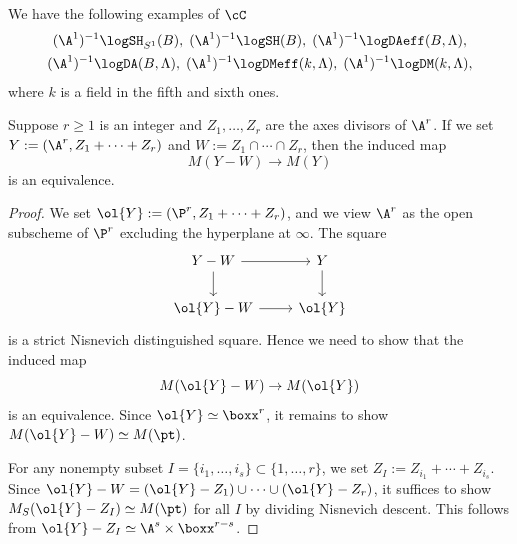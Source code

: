 \documentclass[10pt]{amsart}
\begin{document}
\begin{exm}
\label{2.4}
We have the following examples of $\cC$
\begin{gather*}
(\A^1)^{-1}\logSH_{S^1}(B),
\;
(\A^1)^{-1}\logSH(B),
\;
(\A^1)^{-1}\logDAeff(B,\Lambda),
\\
(\A^1)^{-1}\logDA(B,\Lambda),
\;
(\A^1)^{-1}\logDMeff(k,\Lambda),
\;
(\A^1)^{-1}\logDM(k,\Lambda),
\end{gather*}
where $k$ is a field in the fifth and sixth ones.
\end{exm}






\begin{lem}
\label{2.2}
Suppose $r\geq 1$ is an integer and $Z_1,\ldots,Z_r$ are the axes divisors of $\A^r$.
If we set $Y:=(\A^r,Z_1+\cdots+Z_r)$ and $W:=Z_1\cap \cdots \cap Z_r$, then the induced map
\[
M(Y-W)
\to
M(Y)
\]
is an equivalence.
\end{lem}
\begin{proof}
We set $\ol{Y}:=(\P^r,Z_1+\cdots+Z_r)$, and we view $\A^r$ as the open subscheme of $\P^r$ excluding the hyperplane at $\infty$.
The square
\[
\begin{tikzcd}
Y-W\ar[d]\ar[r]&
Y\ar[d]
\\
\ol{Y}-W\ar[r]&
\ol{Y}
\end{tikzcd}
\]
is a strict Nisnevich distinguished square.
Hence we need to show that the induced map
\[
M(\ol{Y}-W)\to M(\ol{Y})
\]
is an equivalence.
Since $\ol{Y}\simeq \boxx^r$, it remains to show $M(\ol{Y}-W)\simeq M(\pt)$.

For any nonempty subset $I=\{i_1,\ldots,i_s\}\subset \{1,\ldots,r\}$, we set $Z_I:=Z_{i_1}+ \cdots + Z_{i_s}$.
Since $\ol{Y}-W=(\ol{Y}-Z_1)\cup \cdots \cup (\ol{Y}-Z_r)$, it suffices to show $M_S(\ol{Y}-Z_I)\simeq M(\pt)$ for all $I$ by dividing Nisnevich descent.
This follows from $\ol{Y}-Z_I\simeq \A^s \times \boxx^{r-s}$.
\end{proof}
\end{document}
